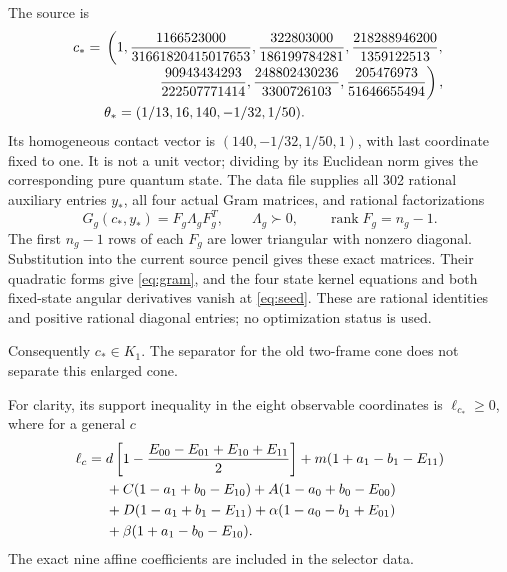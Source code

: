 \documentclass[11pt]{article}
\begin{document}
The source is
\begin{equation}
\begin{aligned}
 c_*={}&\left(1,
 \frac{1166523000}{31661820415017653},
 \frac{322803000}{186199784281},
 \frac{218288946200}{1359122513},\right.\\[-1mm]
 &\left.\hspace{13mm}
 \frac{90943434293}{222507771414},
 \frac{248802430236}{3300726103},
 \frac{205476973}{51646655494}\right),\\
 &\theta_*=(1/13,16,140,-1/32,1/50).
\end{aligned}
\label{eq:seed}
\end{equation}
Its homogeneous contact vector is $(140,-1/32,1/50,1)$, with last
coordinate fixed to one.  It is not a unit vector; dividing by its
Euclidean norm gives the corresponding pure quantum state.
The data file
supplies all 302 rational auxiliary entries $y_*$, all four actual Gram
matrices, and rational factorizations
\begin{equation}
 G_g(c_*,y_*)=F_g\Lambda_gF_g^T,
 \qquad \Lambda_g\succ0,
 \qquad \operatorname{rank}F_g=n_g-1.
 \label{eq:seedfact}
\end{equation}
The first $n_g-1$ rows of each $F_g$ are lower triangular with nonzero
diagonal.  Substitution into the current source pencil gives these exact
matrices.  Their quadratic forms give \eqref{eq:gram}, and the four state
kernel equations and both fixed-state angular derivatives vanish at
\eqref{eq:seed}.  These are rational identities and positive rational
diagonal entries; no optimization status is used.

Consequently $c_*\in K_1$.  The separator for the old two-frame cone
does not separate this enlarged cone.

For clarity, its support inequality in the eight observable coordinates is
$\ell_{c_*}\geq0$, where for a general $c$
\begin{align}
\ell_c={}&d\left[1-\frac{E_{00}-E_{01}+E_{10}+E_{11}}2\right]
 +m(1+a_1-b_1-E_{11})\notag\\
 &+C(1-a_1+b_0-E_{10})+A(1-a_0+b_0-E_{00})\notag\\
 &+D(1-a_1+b_1-E_{11})
 +\alpha(1-a_0-b_1+E_{01})\notag\\
 &+\beta(1+a_1-b_0-E_{10}).
 \label{eq:visible}
\end{align}
The exact nine affine coefficients are included in the selector data.
\end{document}
